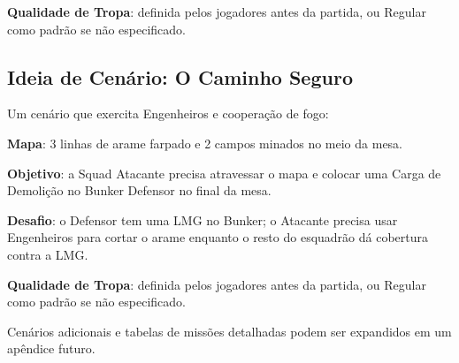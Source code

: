 \textbf{Qualidade de Tropa}: definida pelos jogadores antes da partida, ou Regular como padrão se não especificado.

\subsection{Ideia de Cenário: O Caminho Seguro}

Um cenário que exercita Engenheiros e cooperação de fogo:

\textbf{Mapa}: 3 linhas de arame farpado e 2 campos minados no meio da mesa.

\textbf{Objetivo}: a Squad Atacante precisa atravessar o mapa e colocar uma Carga de Demolição no Bunker Defensor no final da mesa.

\textbf{Desafio}: o Defensor tem uma LMG no Bunker; o Atacante precisa usar Engenheiros para cortar o arame enquanto o resto do esquadrão dá cobertura contra a LMG.

\textbf{Qualidade de Tropa}: definida pelos jogadores antes da partida, ou Regular como padrão se não especificado.

\begin{nota}
Cenários adicionais e tabelas de missões detalhadas podem ser expandidos em um apêndice futuro.
\end{nota}
